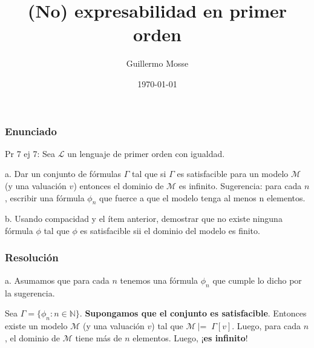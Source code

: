 \documentclass{beamer}
\title{(No) expresabilidad en primer orden}
\author{Guillermo Mosse} %
\institute[UBA] %
{
Universidad de Buenos Aires\\ %
\medskip
\textit{billy.mosse@gmail.com} \\ %

}
\date{\today} %
\begin{document}
\begin{frame}
\titlepage %
\end{frame}


\begin{frame}
\frametitle{Enunciado}




\bigskip


Pr 7 ej 7: Sea $\mathcal{L}$ un lenguaje de primer orden con igualdad.

\bigskip
	a. Dar un conjunto de fórmulas $\Gamma$ tal que si $\Gamma$ es satisfacible para un modelo $\mathcal{M}$ (y una valuación $v$) entonces el dominio de $\mathcal{M}$ es infinito. Sugerencia: para cada $n$, escribir una fórmula $\phi_n$ que fuerce a que el modelo tenga al menos n elementos. 
	
	\bigskip
	b. Usando compacidad y el ítem anterior, demostrar que no existe ninguna fórmula $\phi$ tal que $\phi$ es satisfacible sii el dominio del modelo es finito.

\end{frame}


\begin{frame}
\frametitle{Resolución}

 a. Asumamos que para cada $n$ tenemos una fórmula $\phi_n$ que cumple lo dicho por la sugerencia.
 
 \pause
 
 \bigskip
 
 	Sea $\Gamma = \{\phi_n : n \in \mathbb{N}\}$. \textbf{Supongamos que el conjunto es satisfacible}. Entonces existe un modelo $\mathcal{M}$ (y una valuación $v$) tal que $\mathcal{M}\ |$= $\ \Gamma[v]$. Luego, para cada $n$, el dominio de
 	 $\mathcal{M}$ tiene más de $n$ elementos. Luego, ¡\textbf{es infinito}!
 	 
	
\end{frame}
\end{document}
